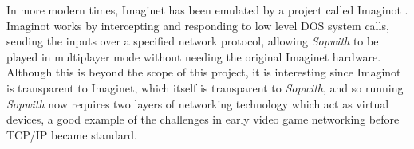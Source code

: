 In more modern times, Imaginet has been emulated by a project called Imaginot \cite{imaginot}. Imaginot works by intercepting and responding to low level DOS system calls, sending the inputs over a specified network protocol, allowing \textit{Sopwith} to be played in multiplayer mode without needing the original Imaginet hardware. Although this is beyond the scope of this project, it is interesting since Imaginot is transparent to Imaginet, which itself is transparent to \textit{Sopwith}, and so running \textit{Sopwith} now requires two layers of networking technology which act as virtual devices, a good example of the challenges in early video game networking before TCP/IP became standard.
